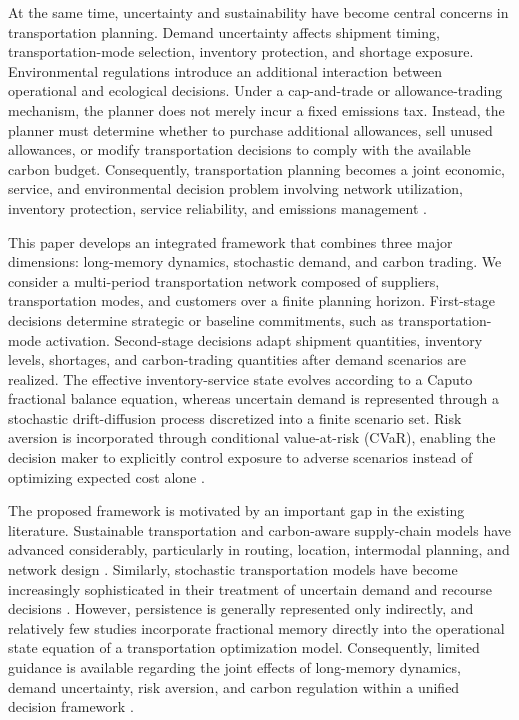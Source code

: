 At the same time, uncertainty and sustainability have become central concerns in transportation planning. Demand uncertainty affects shipment timing, transportation-mode selection, inventory protection, and shortage exposure. Environmental regulations introduce an additional interaction between operational and ecological decisions. Under a cap-and-trade or allowance-trading mechanism, the planner does not merely incur a fixed emissions tax. Instead, the planner must determine whether to purchase additional allowances, sell unused allowances, or modify transportation decisions to comply with the available carbon budget. Consequently, transportation planning becomes a joint economic, service, and environmental decision problem involving network utilization, inventory protection, service reliability, and emissions management \cite{bektas2011,asghari2021,homayouni2023carbon,qu2021,mirzaee2024green}.

This paper develops an integrated framework that combines three major dimensions: long-memory dynamics, stochastic demand, and carbon trading. We consider a multi-period transportation network composed of suppliers, transportation modes, and customers over a finite planning horizon. First-stage decisions determine strategic or baseline commitments, such as transportation-mode activation. Second-stage decisions adapt shipment quantities, inventory levels, shortages, and carbon-trading quantities after demand scenarios are realized. The effective inventory-service state evolves according to a Caputo fractional balance equation, whereas uncertain demand is represented through a stochastic drift-diffusion process discretized into a finite scenario set. Risk aversion is incorporated through conditional value-at-risk (CVaR), enabling the decision maker to explicitly control exposure to adverse scenarios instead of optimizing expected cost alone \cite{rockafellar2000}.

The proposed framework is motivated by an important gap in the existing literature. Sustainable transportation and carbon-aware supply-chain models have advanced considerably, particularly in routing, location, intermodal planning, and network design \cite{bektas2011,asghari2021}. Similarly, stochastic transportation models have become increasingly sophisticated in their treatment of uncertain demand and recourse decisions \cite{birge2011,shapiro2009,gbadegoye2025intermodal}. However, persistence is generally represented only indirectly, and relatively few studies incorporate fractional memory directly into the operational state equation of a transportation optimization model. Consequently, limited guidance is available regarding the joint effects of long-memory dynamics, demand uncertainty, risk aversion, and carbon regulation within a unified decision framework \cite{cuong2023,haque2026}.

